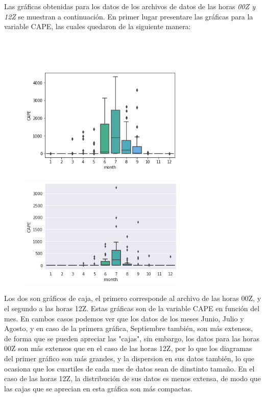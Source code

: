 \documentclass{article}
\begin{document}
Las gráficas obtenidas para  los datos de los archivos de datos de las horas \textit{00Z y 12Z} se muestran a continuación. En primer lugar presentare las gráficas para la variable CAPE, las cuales quedaron de la siguiente manera:  \\
\\
\\ 
\\ 
\begin{figure}[htb]
    \begin{center}
    \includegraphics[width=8cm]{BoxPlot00z.png} 
    \end{center}
\end{figure}

\begin{figure}[htb]
    \begin{center}
    \includegraphics[width=8cm]{BoxPlot12Z.png} 
    \end{center}
\end{figure}

Los dos son gráficos de caja, el primero corresponde al archivo de las horas 00Z, y el segundo a las horas 12Z. Estas gráficas son de la variable CAPE en función del mes. En cambos casos podemos ver que los datos de los meses Junio, Julio y Agosto, y en caso de la primera gráfica, Septiembre también, son más extensos, de forma que se pueden apreciar las "cajas", sin embargo, los datos para las horas 00Z son más extensos que en el caso de las horas 12Z, por lo que los diagramas del primer gráfico son más grandes, y la dispersion en sus datos también, lo que ocasiona que los cuartiles de cada mes de datos sean de dinstinto tamaño. En el caso de las horas 12Z, la distribución de sus datos es menos extensa, de modo que las cajas que se aprecian en esta gráfica son más compactas. \\
\end{document}
